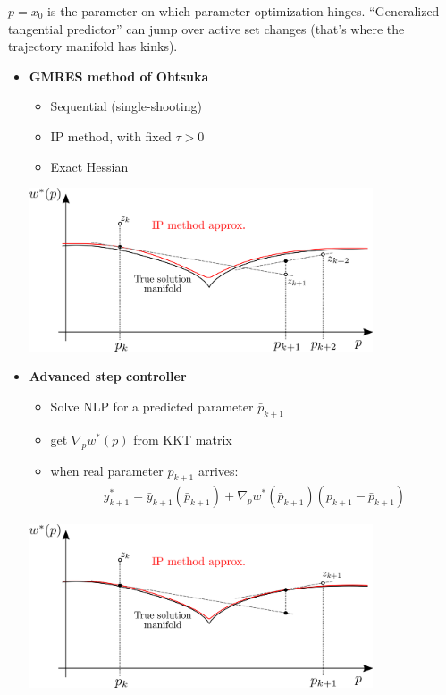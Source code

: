 \begin{tcolorbox}[colback=blue!5!white, %
  colframe=blue!75!black, %
  title=\textbf{Predictor-Corrector Path-following for RT-OC and NMPC}]
  $p=x_0$ is the parameter on which parameter optimization hinges.
  ``Generalized tangential predictor'' can jump over active set changes (that's
  where the trajectory manifold has kinks).
  \begin{itemize}
  \item \textbf{GMRES method of Ohtsuka}
    \begin{itemize}
    \item Sequential (single-shooting)
    \item IP method, with fixed $\tau>0$
    \item Exact Hessian\\
    \end{itemize}
    \includegraphics[width=0.8\textwidth]{ohtsuka}
  \item \textbf{Advanced step controller}
    \begin{itemize}
    \item Solve NLP for a predicted parameter $\bar{p}_{k+1}$
    \item get $\nabla_p w^*(p)$ from KKT matrix
    \item when real parameter $p_{k+1}$ arrives:
      \begin{align*}
        y^*_{k+1} = \bar{y}_{k+1}(\bar{p}_{k+1})+\nabla_pw^*(\bar{p}_{k+1})(p_{k+1} - \bar{p}_{k+1})
      \end{align*}
    \end{itemize}
    \includegraphics[width=0.8\textwidth]{advanced_step}

\end{itemize}
\end{tcolorbox}
